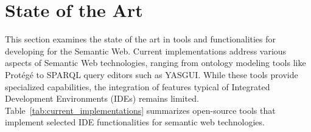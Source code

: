 %
%
%
%
%
%
%
%
%
%
%
%
%
%



\section{State of the Art}%
\label{sec:related_work}

This section examines the state of the art in tools and functionalities for developing for the Semantic Web. 
Current implementations address various aspects of Semantic Web technologies, ranging from ontology modeling tools like Protégé to SPARQL query editors such as YASGUI.
While these tools provide specialized capabilities, the integration of features typical of Integrated Development Environments (IDEs) remains limited. 
Table~\ref{tab:current_implementations} summarizes open-source tools that implement selected IDE functionalities for semantic web technologies.

